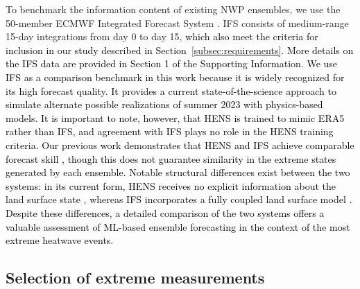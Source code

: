 \documentclass[draft]{agujournal2019}
\renewcommand{\st}[1]{\unskip}
\newcommand{\newTxt}{\textcolor{black}}
\begin{document}
To benchmark the information content of existing NWP ensembles, we use the 50-member ECMWF Integrated Forecast System \citep[IFS;][]{ECMWF}. IFS consists of medium-range 15-day integrations from day 0 to day 15, \newTxt{which also meet the criteria for inclusion in our study described in Section~\ref{subsec:requirements}. More details on the IFS data are provided in Section 1 of the Supporting Information.} 
\st{with an effective resolution of 18~km version CY47R3,234
used from June 1 to June 27, 2023; ECMWF, 2021) or 9~km (version CY48R1, used from June 28 to August 31, 2023; ECMWF, 2023). The switch in IFS versions was dictated by ECMWF's schedule of updates  (ECMWF, 2025a).  The integrations are initialized twice daily at 00 and 12 UTC. In the vertical, the integrations have 91 (CY47R3) or 137 (CY48R1) levels, with the model top at 1 Pa.  The two-dimensional IFS fields we use in this study were interpolated to 0.25-degree resolution by ECMWF before downloading.  As ERA5 is based upon a recent but earlier cycle of the IFS system CY41R2; Hersbach et al., 2020), comparison of HENS against IFS quantifies the additional information content of the larger HENS ensemble size relative to that of IFS along with small systematic offsets between CY41R2 and CY47R3/CY48R1.}
\newTxt{We use IFS as a comparison benchmark in this work because it is widely recognized for its high forecast quality.  It provides a current state-of-the-science approach to simulate alternate possible realizations of summer 2023 with physics-based models. It is important to note, however, that HENS is trained to mimic ERA5 rather than IFS, and agreement with IFS plays no role in the HENS training criteria. Our previous work demonstrates that HENS and IFS achieve comparable forecast skill \citep{Mahesh2024hugeensemblesidesign}, though this does not guarantee similarity in the extreme states generated by each ensemble. Notable structural differences exist between the two systems: in its current form, HENS receives no explicit information about the land surface state \citep[all the input variables to the model are atmospheric variables; see][]{Mahesh2024hugeensemblesidesign}, whereas IFS incorporates a fully coupled land surface model \citep{ECMWF}. Despite these differences, a detailed comparison of the two systems offers a valuable assessment of ML-based ensemble forecasting in the context of the most extreme heatwave events.}

\subsection{Selection of extreme measurements} \label{sec:goals_data}
\end{document}

